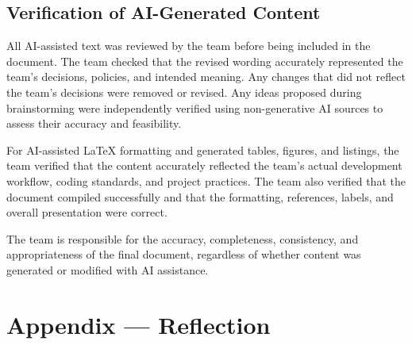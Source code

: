 \documentclass{article}
\begin{document}
\subsection{Verification of AI-Generated Content}


All AI-assisted text was reviewed by the team before being included in the
document. The team checked that the revised wording accurately represented
the team's decisions, policies, and intended meaning. Any changes that did
not reflect the team's decisions were removed or revised. Any ideas proposed
during brainstorming were independently verified using non-generative AI
sources to assess their accuracy and feasibility.

For AI-assisted \LaTeX{} formatting and generated tables, figures, and
listings, the team verified that the content accurately reflected the team's
actual development workflow, coding standards, and project practices. The
team also verified that the document compiled successfully and that the
formatting, references, labels, and overall presentation were correct.

The team is responsible for the accuracy, completeness, consistency, and
appropriateness of the final document, regardless of whether content was
generated or modified with AI assistance.

\newpage{}

\section{Appendix --- Reflection}


% 
\end{document}
